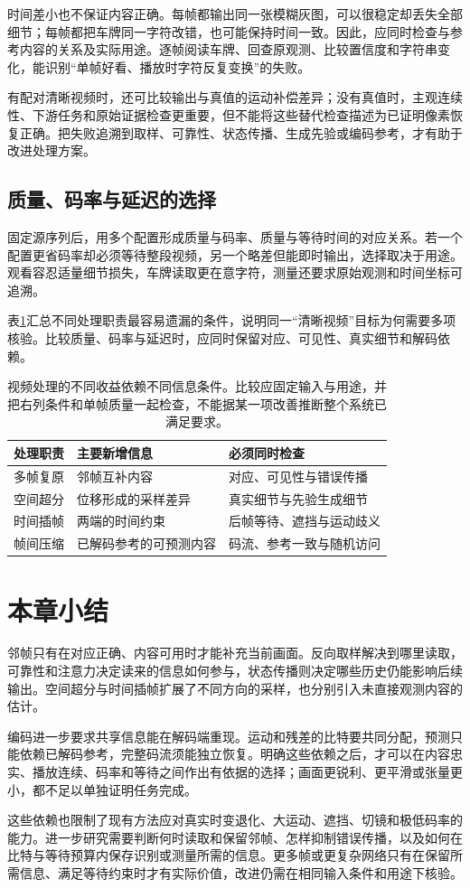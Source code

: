 时间差小也不保证内容正确。每帧都输出同一张模糊灰图，可以很稳定却丢失全部细节；每帧都把车牌同一字符改错，也可能保持时间一致。因此，应同时检查与参考内容的关系及实际用途。逐帧阅读车牌、回查原观测、比较置信度和字符串变化，能识别“单帧好看、播放时字符反复变换”的失败。

有配对清晰视频时，还可比较输出与真值的运动补偿差异；没有真值时，主观连续性、下游任务和原始证据检查更重要，但不能将这些替代检查描述为已证明像素恢复正确。把失败追溯到取样、可靠性、状态传播、生成先验或编码参考，才有助于改进处理方案。

\subsection{质量、码率与延迟的选择}
\label{sec:vision-video-quality-rate-latency}

固定源序列后，用多个配置形成质量与码率、质量与等待时间的对应关系。若一个配置更省码率却必须等待整段视频，另一个略差但能即时输出，选择取决于用途。观看容忍适量细节损失，车牌读取更在意字符，测量还要求原始观测和时间坐标可追溯。

表\ref{tab:vision-video-tradeoff}汇总不同处理职责最容易遗漏的条件，说明同一“清晰视频”目标为何需要多项核验。比较质量、码率与延迟时，应同时保留对应、可见性、真实细节和解码依赖。
\begin{table}[htbp]
  \centering
  \begin{tabularx}{\linewidth}{@{}lXX@{}}
    \toprule
    处理职责 & 主要新增信息 & 必须同时检查\\
    \midrule
    多帧复原 & 邻帧互补内容 & 对应、可见性与错误传播\\
    空间超分 & 位移形成的采样差异 & 真实细节与先验生成细节\\
    时间插帧 & 两端的时间约束 & 后帧等待、遮挡与运动歧义\\
    帧间压缩 & 已解码参考的可预测内容 & 码流、参考一致与随机访问\\
    \bottomrule
  \end{tabularx}
  \caption{视频处理的不同收益依赖不同信息条件。比较应固定输入与用途，并把右列条件和单帧质量一起检查，不能据某一项改善推断整个系统已满足要求。}
  \label{tab:vision-video-tradeoff}
\end{table}
\FloatBarrier

\section{本章小结}
\label{sec:vision-video-restoration-summary}

邻帧只有在对应正确、内容可用时才能补充当前画面。反向取样解决到哪里读取，可靠性和注意力决定读来的信息如何参与，状态传播则决定哪些历史仍能影响后续输出。空间超分与时间插帧扩展了不同方向的采样，也分别引入未直接观测内容的估计。

编码进一步要求共享信息能在解码端重现。运动和残差的比特要共同分配，预测只能依赖已解码参考，完整码流须能独立恢复。明确这些依赖之后，才可以在内容忠实、播放连续、码率和等待之间作出有依据的选择；画面更锐利、更平滑或张量更小，都不足以单独证明任务完成。

这些依赖也限制了现有方法应对真实时变退化、大运动、遮挡、切镜和极低码率的能力。进一步研究需要判断何时读取和保留邻帧、怎样抑制错误传播，以及如何在比特与等待预算内保存识别或测量所需的信息。更多帧或更复杂网络只有在保留所需信息、满足等待约束时才有实际价值，改进仍需在相同输入条件和用途下核验。
